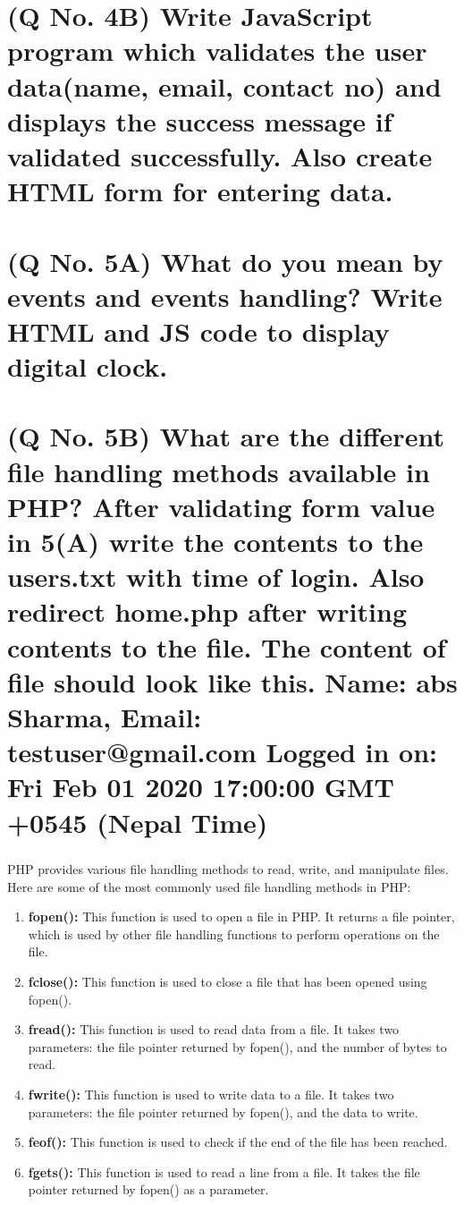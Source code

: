 \documentclass[11pt]{article}
\begin{document}
\section{(Q No. 4B) Write JavaScript program which validates the user data(name, email, contact no) and displays the success message if validated successfully. Also create HTML form for entering data.}




\section{(Q No. 5A) What do you mean by events and events handling? Write HTML and JS code to display digital clock.}



\section{(Q No. 5B) What are the different file handling methods available in PHP? After validating form value in 5(A) write the contents to the users.txt with time of login. Also redirect home.php after writing contents to the file. The content of file should look like this. 
Name: abs Sharma, Email: testuser@gmail.com Logged in on: Fri Feb 01 2020 17:00:00 GMT +0545 (Nepal Time)}
\subparagraph{}
PHP provides various file handling methods to read, write, and manipulate files. Here are some of the most commonly used file handling methods in PHP:
    \begin{enumerate}
        \item \textbf{fopen():} This function is used to open a file in PHP. It returns a file pointer, which is used by other file handling functions to perform operations on the file.

        \item \textbf{fclose():} This function is used to close a file that has been opened using fopen().
    
        \item \textbf{fread():} This function is used to read data from a file. It takes two parameters: the file pointer returned by fopen(), and the number of bytes to read.
    
        \item \textbf{fwrite():} This function is used to write data to a file. It takes two parameters: the file pointer returned by fopen(), and the data to write.
    
        \item \textbf{feof():} This function is used to check if the end of the file has been reached.
    
        \item \textbf{fgets():} This function is used to read a line from a file. It takes the file pointer returned by fopen() as a parameter.
    \end{enumerate}
\end{document}
